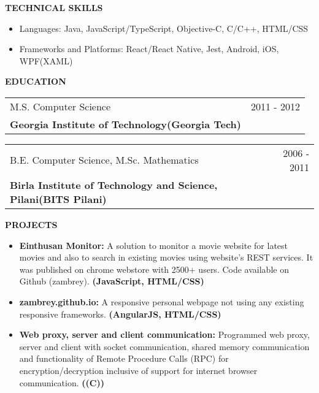 \documentclass[a4paper]{article}
\makeatletter
\newcommand{\resumesection}[1]{
	\vspace*{-0.5\baselineskip}
	\begin{flushleft}
		\large{\textbf{\uppercase{#1}}}
	\end{flushleft}
} %
\newcommand{\educationsubsection}[4]{
	\begin{tabular*}{1.0\textwidth}{@{\extracolsep{\fill}} l r}
		#1 & #2 \\
		\textbf{#3} & #4\\
	\end{tabular*}
} %
\newcommand{\project}[3]{\item \textbf{#1}#2 \textbf{(#3)}} %
\newcommand{\customitemizespacing}{\addtolength{\itemsep}{-0.5\baselineskip}}
\makeatother
\begin{document}
\resumesection{Technical Skills}
\begin{itemize}
	\item Languages: Java, JavaScript/TypeScript, Objective-C, C/C++, HTML/CSS
	\item Frameworks and Platforms: React/React Native, Jest, Android, iOS, WPF(XAML)
\end{itemize}

\resumesection{Education}
\educationsubsection{M.S. Computer Science}{2011 - 2012}{Georgia Institute of Technology(Georgia Tech)}{}
\newline
\educationsubsection{B.E. Computer Science, M.Sc. Mathematics}{2006 - 2011}{Birla Institute of Technology and Science, Pilani(BITS Pilani)}{}

\resumesection{Projects}
\begin{itemize}
	\project{Einthusan Monitor: }{A solution to monitor a movie website for latest movies and also to search in existing movies using website's REST services. It was published on chrome webstore with 2500+ users. Code available on Github (zambrey).}{JavaScript, HTML/CSS}
	\project{zambrey.github.io: }{A responsive personal webpage not using any existing responsive frameworks.}{AngularJS, HTML/CSS}
	\project{Web proxy, server and client communication: }{Programmed web proxy, server and client with socket communication, shared memory communication and functionality of Remote Procedure Calls (RPC) for encryption/decryption inclusive of support for internet browser communication.}{(C)}
\end{itemize}
\end{document}
